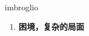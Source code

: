 
\begin{frame}
{\huge imbroglio}
\begin{center}
\begin{enumerate}\Large
  \item \textbf{困境，复杂的局面}
\end{enumerate}
\end{center}
\end{frame}
